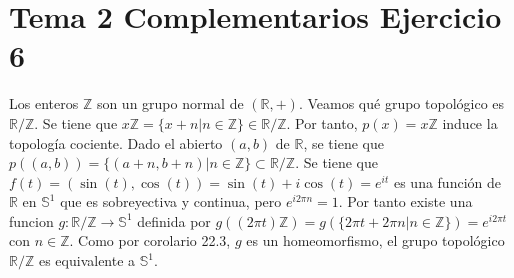 \documentclass{article}
\begin{document}
\section{Tema 2 Complementarios Ejercicio 6}
Los enteros $\mathbb{Z}$ son un grupo normal de $(\mathbb{R},+)$. Veamos qué grupo topológico es $\mathbb{R}/\mathbb{Z}$.
Se tiene que $x\mathbb{Z}=\{x+n|n\in\mathbb{Z}\}\in \mathbb{R}/\mathbb{Z}$. Por tanto, $p(x)=x\mathbb{Z}$ induce la topología cociente. Dado el abierto $(a,b)$ de $\mathbb{R}$, se tiene que $p((a,b))=\{(a+n,b+n)|n\in\mathbb{Z}\}\subset\mathbb{R}/\mathbb{Z}$. Se tiene que $f(t)=(\sin (t),\cos (t))=\sin(t)+i\cos(t)=e^{it}$ es una función de $\mathbb{R}$ en $\mathbb{S}^1$ que es sobreyectiva y continua, pero $e^{i2\pi n}=1$. Por tanto existe una funcion $g: \mathbb{R}/\mathbb{Z}\rightarrow \mathbb{S}^1$ definida por $g((2\pi t)\mathbb{Z})=g(\{2\pi t+2\pi n|n \in \mathbb{Z}\})=e^{i2\pi t}$ con $n\in \mathbb{Z}$. Como por corolario 22.3, $g$ es un homeomorfismo, el grupo topológico $\mathbb{R}/\mathbb{Z}$ es equivalente a $\mathbb{S}^1$.
\end{document}
